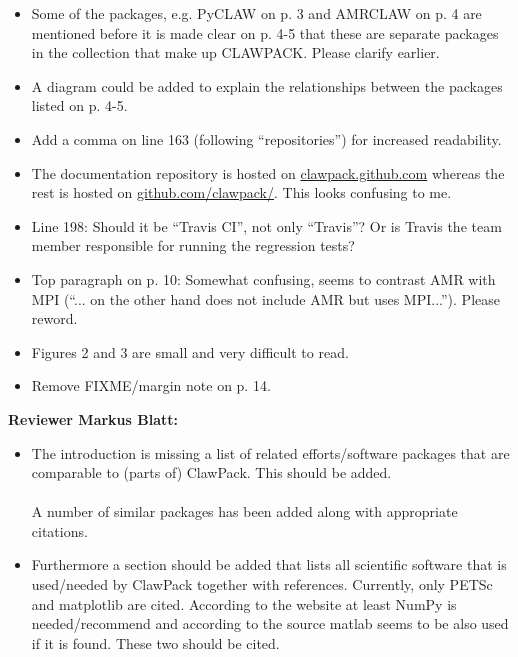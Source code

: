 \documentclass{letter}
\begin{document}
\begin{letter}
\begin{itemize}
    \item Some of the packages, e.g. PyCLAW on p. 3 and AMRCLAW on p. 4 are
    mentioned before it is made clear on p. 4-5 that these are separate packages
    in the collection that make up CLAWPACK. Please clarify earlier.

    \item A diagram could be added to explain the relationships between the
    packages listed on p. 4-5.

    \item Add a comma on line 163 (following ``repositories'') for increased
    readability.

    \item The documentation repository is hosted on \url{clawpack.github.com} whereas
    the rest is hosted on \url{github.com/clawpack/}. This looks confusing to me.

    \item Line 198: Should it be ``Travis CI'', not only ``Travis''? Or is
    Travis the team member responsible for running the regression tests?

    \item Top paragraph on p. 10: Somewhat confusing, seems to contrast AMR with
    MPI (``... on the other hand does not include AMR but uses MPI...''). Please
    reword.

    \item Figures 2 and 3 are small and very difficult to read.

    \item Remove FIXME/margin note on p. 14.
\end{itemize}


\textbf{Reviewer Markus Blatt:}
\begin{itemize}
    \item The introduction is missing a list of related efforts/software
    packages that are comparable to (parts of) ClawPack. This should be
    added.
    \\ ~ \\
    A number of similar packages has been added along with appropriate
    citations.

    \item Furthermore a section should be added that lists all scientific
    software that is used/needed by ClawPack together with
    references. Currently, only PETSc and matplotlib are cited. According
    to the website at least NumPy is needed/recommend and according to the
    source matlab seems to be also used if it is found. These two should
    be cited.


\end{itemize}
\end{letter}
\end{document}
